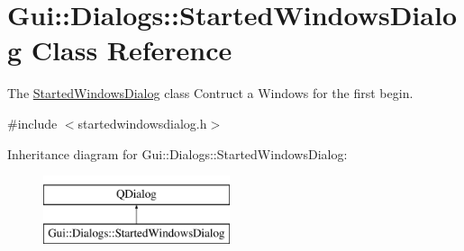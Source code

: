 \hypertarget{classGui_1_1Dialogs_1_1StartedWindowsDialog}{\section{Gui\-:\-:Dialogs\-:\-:Started\-Windows\-Dialog Class Reference}
\label{classGui_1_1Dialogs_1_1StartedWindowsDialog}
}


The \hyperlink{classGui_1_1Dialogs_1_1StartedWindowsDialog}{Started\-Windows\-Dialog} class Contruct a Windows for the first begin.  




{\ttfamily \#include $<$startedwindowsdialog.\-h$>$}

Inheritance diagram for Gui\-:\-:Dialogs\-:\-:Started\-Windows\-Dialog\-:\begin{figure}[H]
\begin{center}
\leavevmode
\includegraphics[height=2.000000cm]{de/de1/classGui_1_1Dialogs_1_1StartedWindowsDialog}
\end{center}
\end{figure}
